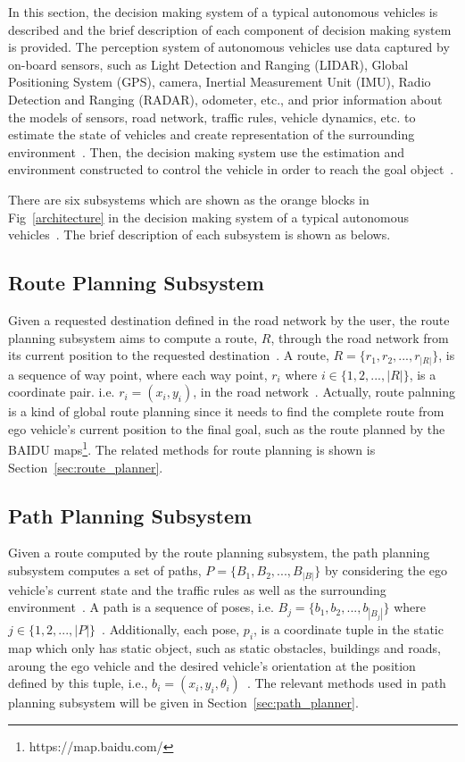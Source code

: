 \documentclass[conference]{IEEEtran}
\begin{document}
In this section, the decision making system of a typical autonomous vehicles is described and the brief description of each component of decision making system is provided. The perception system of autonomous vehicles use data captured by on-board sensors, such as Light Detection and Ranging (LIDAR), Global Positioning System (GPS), camera, Inertial Measurement Unit (IMU), Radio Detection and Ranging (RADAR), odometer, etc., and prior information about the models of sensors, road network, traffic rules, vehicle dynamics, etc. to estimate the state of vehicles and create representation of the surrounding environment~\cite{self_driving}. Then, the decision making system use the estimation and environment constructed to control the vehicle in order to reach the goal object~\cite{Brian2016}. 

There are six subsystems which are shown as the orange blocks in Fig~\ref{architecture} in the decision making system of a typical autonomous vehicles~\cite{self_driving}. The brief description of each subsystem is shown as belows.

\subsection{Route Planning Subsystem}
Given a requested destination defined in the road network by the user, the route planning subsystem aims to compute a route, $R$, through the road network from its current position to the requested destination~\cite{Brian2016}. A route, $R=\{r_1, r_2,...,r_{|R|}\}$, is a sequence of way point, where each way point, $r_i$ where $i \in \{1,2,...,|R|\}$, is a coordinate pair. i.e. $r_i = (x_i, y_i)$, in the road network~\cite{self_driving}. Actually, route palnning is a kind of global route planning since it needs to find the complete route from ego vehicle's current position to the final goal, such as the route planned by the BAIDU maps\footnote{https://map.baidu.com/}. The related methods for route planning is shown is Section~\ref{sec:route_planner}.

\subsection{Path Planning Subsystem}
Given a route computed by the route planning subsystem, the path planning subsystem computes a set of paths, $P=\{B_1, B_2, ..., B_{|B|}\}$ by considering the ego vehicle's current state and the traffic rules as well as the surrounding environment~\cite{self_driving}. A path is a sequence of poses, i.e. $B_j=\{b_1, b_2, ..., b_{|B_j|}\}$ where $j \in \{1, 2,...,|P|\}$~\cite{self_driving}. Additionally, each pose, $p_i$, is a coordinate tuple in the static map which only has static object, such as static obstacles, buildings and roads, aroung the ego vehicle and the desired vehicle's orientation at the position defined by this tuple, i.e., $b_i=(x_i, y_i, \theta_i)$~\cite{self_driving}. The relevant methods used in path planning subsystem will be given in Section~\ref{sec:path_planner}.
\end{document}
